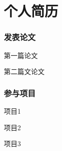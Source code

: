 ﻿\chapter{个人简历}
\subsection*{发表论文}
{
\setlength\parindent{0em}
\everypar{\hangafter=1\hangindent=2em\relax}

第一篇论文

第二篇文论文

\subsection*{参与项目}

项目1

项目2

项目3
}
